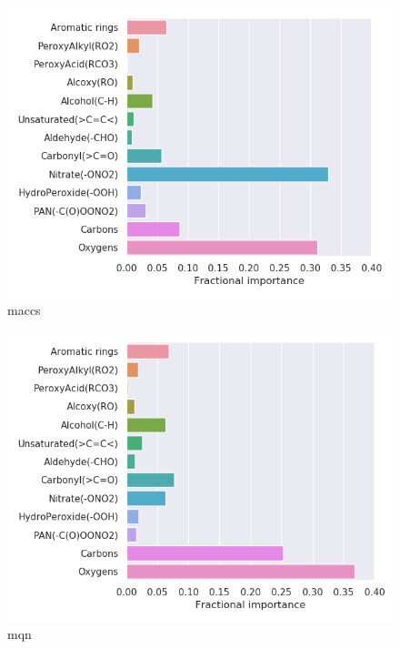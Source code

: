 \begin{subfigure}[b]{0.46\textwidth}
    \centering
    \includegraphics[width=\textwidth]{outputs/t-SNE/maccs/legend.png}
    \caption{maccs}
    \label{fig:legend_t-SNE_maccs}
\end{subfigure}
\begin{subfigure}[b]{0.46\textwidth}
    \centering
    \includegraphics[width=\textwidth]{outputs/t-SNE/mqn/legend.png}
    \caption{mqn}
    \label{fig:legend_t-SNE_mqn}
\end{subfigure}\\

